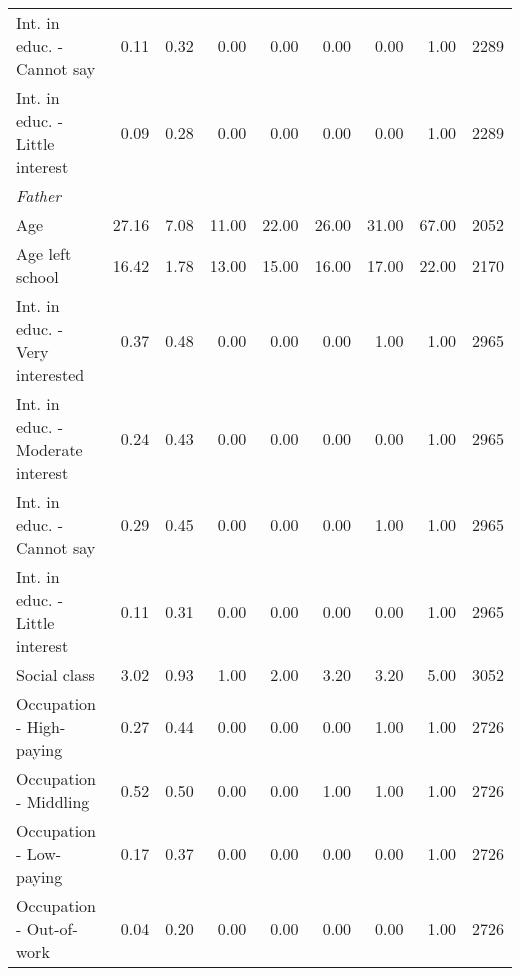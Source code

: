 \begin{tabular}{lrrrrrrrr}
\hspace{1em}Int. in educ. - Cannot say & 0.11 & 0.32 & 0.00 & 0.00 & 0.00 & 0.00 & 1.00 & 2289\\
\hspace{1em}Int. in educ. - Little interest & 0.09 & 0.28 & 0.00 & 0.00 & 0.00 & 0.00 & 1.00 & 2289\\
\midrule
\multicolumn{9}{l}{\textit{Father}}\\
\midrule
\hspace{1em}Age & 27.16 & 7.08 & 11.00 & 22.00 & 26.00 & 31.00 & 67.00 & 2052\\
\hspace{1em}Age left school & 16.42 & 1.78 & 13.00 & 15.00 & 16.00 & 17.00 & 22.00 & 2170\\
\hspace{1em}Int. in educ. - Very interested & 0.37 & 0.48 & 0.00 & 0.00 & 0.00 & 1.00 & 1.00 & 2965\\
\hspace{1em}Int. in educ. - Moderate interest & 0.24 & 0.43 & 0.00 & 0.00 & 0.00 & 0.00 & 1.00 & 2965\\
\hspace{1em}Int. in educ. - Cannot say & 0.29 & 0.45 & 0.00 & 0.00 & 0.00 & 1.00 & 1.00 & 2965\\
\hspace{1em}Int. in educ. - Little interest & 0.11 & 0.31 & 0.00 & 0.00 & 0.00 & 0.00 & 1.00 & 2965\\
\hspace{1em}Social class & 3.02 & 0.93 & 1.00 & 2.00 & 3.20 & 3.20 & 5.00 & 3052\\
\hspace{1em}Occupation - High-paying & 0.27 & 0.44 & 0.00 & 0.00 & 0.00 & 1.00 & 1.00 & 2726\\
\hspace{1em}Occupation - Middling & 0.52 & 0.50 & 0.00 & 0.00 & 1.00 & 1.00 & 1.00 & 2726\\
\hspace{1em}Occupation - Low-paying & 0.17 & 0.37 & 0.00 & 0.00 & 0.00 & 0.00 & 1.00 & 2726\\
\hspace{1em}Occupation - Out-of-work & 0.04 & 0.20 & 0.00 & 0.00 & 0.00 & 0.00 & 1.00 & 2726\\
\bottomrule
\end{tabular}
